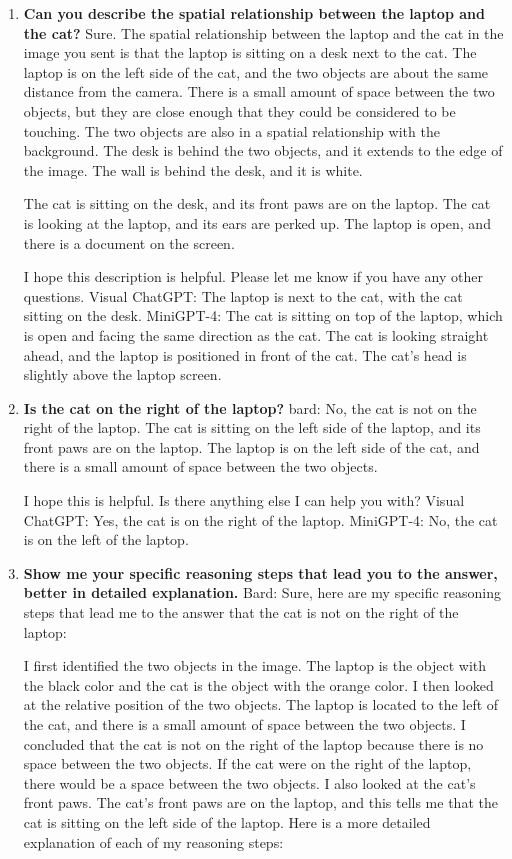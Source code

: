     \begin{enumerate}
        \item \textbf{Can you describe the spatial relationship between the laptop and the cat?}
        \subitem 
        Sure. The spatial relationship between the laptop and the cat in the image you sent is that the laptop is sitting on a desk next to the cat. The laptop is on the left side of the cat, and the two objects are about the same distance from the camera. There is a small amount of space between the two objects, but they are close enough that they could be considered to be touching.
        The two objects are also in a spatial relationship with the background. The desk is behind the two objects, and it extends to the edge of the image. The wall is behind the desk, and it is white.

        The cat is sitting on the desk, and its front paws are on the laptop. The cat is looking at the laptop, and its ears are perked up. The laptop is open, and there is a document on the screen.

        I hope this description is helpful. Please let me know if you have any other questions.
        \subitem Visual ChatGPT: The laptop is next to the cat, with the cat sitting on the desk.
        \subitem MiniGPT-4: The cat is sitting on top of the laptop, which is open and facing the same direction as the cat. The cat is looking straight ahead, and the laptop is positioned in front of the cat. The cat’s head is slightly above the laptop screen.
        \item \textbf{Is the cat on the right of the laptop?}
        \subitem bard: No, the cat is not on the right of the laptop. The cat is sitting on the left side of the laptop, and its front paws are on the laptop. The laptop is on the left side of the cat, and there is a small amount of space between the two objects.

        I hope this is helpful. Is there anything else I can help you with?
        \subitem Visual ChatGPT: Yes, the cat is on the right of the laptop.
        \subitem MiniGPT-4: No, the cat is on the left of the laptop.
        \item \textbf{Show me your specific reasoning steps that lead you to the answer, better in detailed explanation.}
        \subitem Bard:
        Sure, here are my specific reasoning steps that lead me to the answer that the cat is not on the right of the laptop:
        
        I first identified the two objects in the image. The laptop is the object with the black color and the cat is the object with the orange color.
        I then looked at the relative position of the two objects. The laptop is located to the left of the cat, and there is a small amount of space between the two objects.
        I concluded that the cat is not on the right of the laptop because there is no space between the two objects. If the cat were on the right of the laptop, there would be a space between the two objects.
        I also looked at the cat's front paws. The cat's front paws are on the laptop, and this tells me that the cat is sitting on the left side of the laptop.
        Here is a more detailed explanation of each of my reasoning steps:
        

\end{enumerate}
